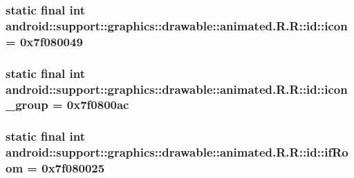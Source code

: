 \hypertarget{classandroid_1_1support_1_1graphics_1_1drawable_1_1animated_1_1_r_1_1id_f23de4d5a9f01fe263d7ed4946aadfa7}{
\subsubsection[{icon}]{\setlength{\rightskip}{0pt plus 5cm}static final int android::support::graphics::drawable::animated.R.R::id::icon = 0x7f080049}}
\label{classandroid_1_1support_1_1graphics_1_1drawable_1_1animated_1_1_r_1_1id_f23de4d5a9f01fe263d7ed4946aadfa7}


\hypertarget{classandroid_1_1support_1_1graphics_1_1drawable_1_1animated_1_1_r_1_1id_6b1f19f66de88e0fadaf7a7fa4d2f012}{
\subsubsection[{icon\_\-group}]{\setlength{\rightskip}{0pt plus 5cm}static final int android::support::graphics::drawable::animated.R.R::id::icon\_\-group = 0x7f0800ac}}
\label{classandroid_1_1support_1_1graphics_1_1drawable_1_1animated_1_1_r_1_1id_6b1f19f66de88e0fadaf7a7fa4d2f012}


\hypertarget{classandroid_1_1support_1_1graphics_1_1drawable_1_1animated_1_1_r_1_1id_e8bea16e5f53607eb7fefee7542814c9}{
\subsubsection[{ifRoom}]{\setlength{\rightskip}{0pt plus 5cm}static final int android::support::graphics::drawable::animated.R.R::id::ifRoom = 0x7f080025}}
\label{classandroid_1_1support_1_1graphics_1_1drawable_1_1animated_1_1_r_1_1id_e8bea16e5f53607eb7fefee7542814c9}


